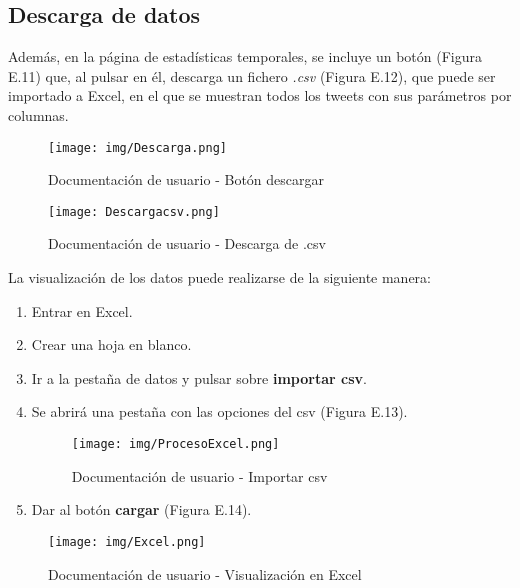 \subsection{Descarga de datos}
Además, en la página de estadísticas temporales, se incluye un botón (Figura E.11) que, al pulsar en él, descarga un fichero \textit{.csv} (Figura E.12), que puede ser importado a Excel, en el que se muestran todos los tweets con sus parámetros por columnas.
\begin{figure}[H]
    \begin{minipage}[b]{0.5\linewidth}
        \centering
        \texttt{[image: img/Descarga.png]} 
        \caption{Documentación de usuario - Botón descargar}
        \label{Documentación de usuario - Botón descargar}
    \end{minipage}
    \hspace{0.4cm}
    \begin{minipage}[b]{0.5\linewidth}
        \centering
        \texttt{[image: Descargacsv.png]}
        \caption{Documentación de usuario - Descarga de .csv}
        \label{Documentación de usuario - Descarga de .csv}
    \end{minipage}
\end{figure}
La visualización de los datos puede realizarse de la siguiente manera:\\
\begin{enumerate}
    \item Entrar en Excel.
    \item Crear una hoja en blanco.
    \item Ir a la pestaña de datos y pulsar sobre \textbf{importar csv}.
    \item Se abrirá una pestaña con las opciones del csv (Figura E.13).
    \begin{figure}[h!]
        \centering
        \texttt{[image: img/ProcesoExcel.png]} \\
        \caption{Documentación de usuario - Importar csv}
        \label{Documentación de usuario - Importar csv}
\end{figure}
    \item Dar al botón \textbf{cargar} (Figura E.14).
\end{enumerate}
\begin{figure}[h!]
    \centering
    \texttt{[image: img/Excel.png]} \\
    \caption{Documentación de usuario - Visualización en Excel}
    \label{Documentación de usuario - Visualización en Excel}
\end{figure}

